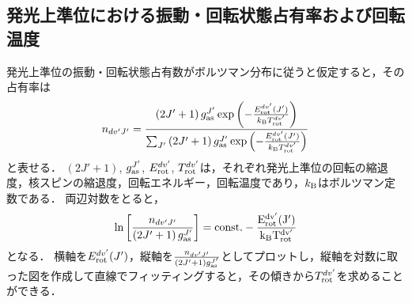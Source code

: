 \subsection{発光上準位における振動・回転状態占有率および回転温度}
発光上準位の振動・回転状態占有数がボルツマン分布に従うと仮定すると，その占有率は
\begin{equation}
    n_{dv'J'} = \frac{ \left(  2J'+1 \right) g^{J'}_{\rm as} \exp \left(-\frac{E^{dv'}_{\rm rot}(J')}{k_{\rm B} T^{dv'}_{\rm rot}} \right) }{ \sum_{J'} \left(  2J'+1 \right) g^{J'}_{\rm as} \exp \left(-\frac{E^{dv'}_{\rm rot}(J')}{k_{\rm B} T^{dv'}_{\rm rot}} \right)}
\end{equation}
と表せる．
$(2J'+1)$, $g^{J'}_{\rm as}$, $E^{dv'}_{\rm rot}$, $T^{dv'}_{\rm rot}$は，それぞれ発光上準位の回転の縮退度，核スピンの縮退度，回転エネルギー，回転温度であり，$k_{\rm B}$はボルツマン定数である．
両辺対数をとると，
\begin{equation}
    \ln \left[ \frac{n_{dv'J'}}{\left( 2J'+1 \right) g^{J'}_{\rm as}} \right]
    = \rm const. - \frac{E^{dv'}_{\rm rot}(J')}{k_{\rm B} T^{dv'}_{\rm rot}}
\end{equation}
となる．
横軸を$E^{dv'}_{\rm rot}(J')$，縦軸を$\frac{n_{dv'J'}}{\left( 2J'+1 \right) g^{J'}_{\rm as}}$としてプロットし，縦軸を対数に取った図を作成して直線でフィッティングすると，その傾きから$T^{dv'}_{\rm rot}$を求めることができる．

